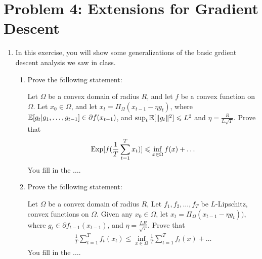 \documentclass[12pt]{article}
\begin{document}
\section*{Problem 4: Extensions for Gradient Descent}
\begin{enumerate}
\item In this exercise, you will show some generalizations of the basic grdient
descent analysis we saw in class.

\begin{enumerate}
\item Prove the following statement:
\begin{proposition*} Let $\Omega$ be a convex domain of radius $R$, and let $f$
be a convex function on $\Omega$. Let $x_0 \in \Omega$, and let $x_{t} =
\Pi_{\Omega}(x_{t-1} - \eta g_t )$, where $\operatorname*{\mathbb{E}}[g_t | g_1,\dots,g_{t-1}] \in
\partial f(x_{t-1})$, and $\sup_{t} \operatorname*{\mathbb{E}}[\|g_t\|^2] \leqslant L^2$ and $\eta =
\frac{R}{L\sqrt{T}}$.  Prove that 
\begin{eqnarray}
 \mathrm{Exp}[f(\frac{1}{T}\sum_{t=1}^T x_t)] \leqslant \inf_{x \in \Omega} f(x) + \dots
\end{eqnarray}
You fill in the $\dots$.
\end{proposition*}
\item Prove the following statement:
\begin{proposition*}  Let $\Omega$ be a convex domain of radius $R$, Let $f_1,f_2,\dots,f_T$ be $L$-Lipschitz, convex functions on $\Omega$. Given any $x_0 \in \Omega$, let $x_{t} = \Pi_{\Omega}(x_{t-1} - \eta g_t ))$, where $g_t \in \partial f_{t-1}(x_{t-1})$, and  $\eta = \frac{LR}{\sqrt{T}}$. Prove that
\begin{eqnarray}
\frac{1}{T}\sum_{t=1}^Tf_t(x_t) \le \inf_{x \in \Omega}\frac{1}{T}\sum_{t=1}^Tf_t(x) + \dots
\end{eqnarray}
You fill in the $\dots$.
\end{proposition*}
\end{enumerate}


\end{enumerate}
\end{document}
